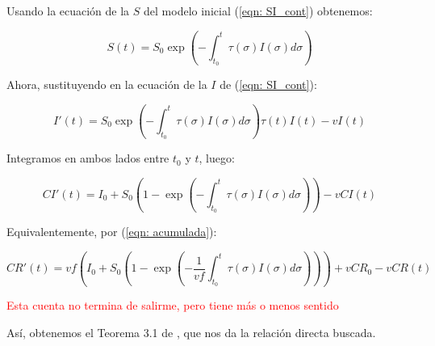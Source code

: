 Usando la ecuación de la $S$ del modelo inicial (\ref{eqn: SI_cont}) obtenemos:

$$S(t) = S_0 \exp{\left( - \int_{t_0}^t \tau(\sigma ) I(\sigma ) d\sigma \right) } $$ 

Ahora, sustituyendo en la ecuación de la $I$ de (\ref{eqn: SI_cont}):

$$I'(t) = S_0 \exp{\left( - \int_{t_0}^t \tau(\sigma ) I(\sigma ) d\sigma \right) } \tau (t) I(t) -vI(t) $$

Integramos en ambos lados entre $t_0$ y $t$, luego:

$$ CI'(t) = I_0 + S_0 \left( 1-\exp{\left(- \int_{t_0}^t \tau (\sigma ) I(\sigma )d\sigma \right)}\right) -vCI(t)$$

Equivalentemente, por (\ref{eqn: acumulada}):

$$CR'(t) = vf\left( I_0 + S_0 \left( 1-\exp{\left(- \frac{1}{vf}\int_{t_0}^t \tau (\sigma ) I(\sigma )d\sigma \right)}\right)\right) +vCR_0 -vCR(t)$$

\textcolor{red}{Esta cuenta no termina de salirme, pero tiene más o menos sentido}

Así, obtenemos el Teorema 3.1 de \cite{demongeotSIEpidemicModel}, que nos da la relación directa buscada.







